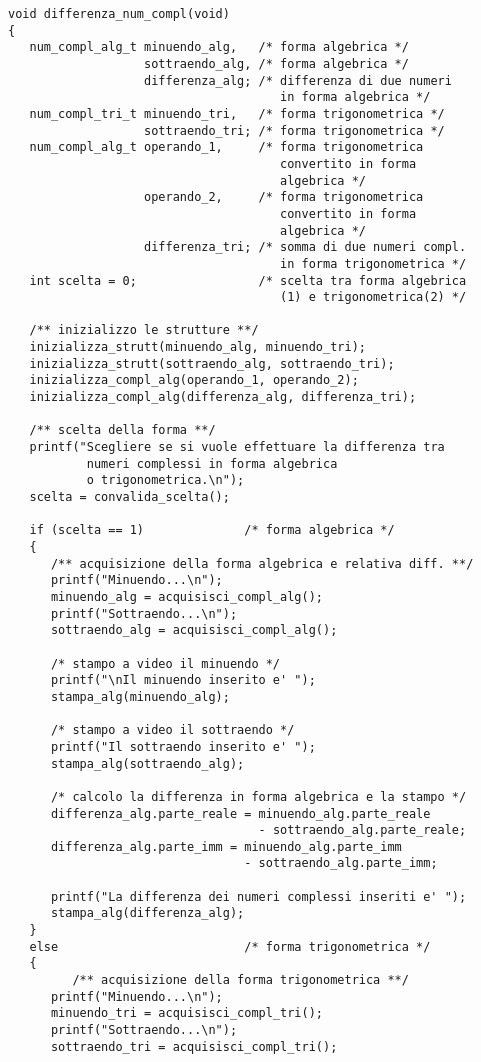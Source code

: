 \documentclass[a4paper,10pt]{article}
\begin{document}
\begin{verbatim}
void differenza_num_compl(void)
{
   num_compl_alg_t minuendo_alg,   /* forma algebrica */
                   sottraendo_alg, /* forma algebrica */
                   differenza_alg; /* differenza di due numeri
                                      in forma algebrica */
   num_compl_tri_t minuendo_tri,   /* forma trigonometrica */
                   sottraendo_tri; /* forma trigonometrica */
   num_compl_alg_t operando_1,     /* forma trigonometrica
                                      convertito in forma
                                      algebrica */
                   operando_2,     /* forma trigonometrica
                                      convertito in forma
                                      algebrica */
                   differenza_tri; /* somma di due numeri compl.
                                      in forma trigonometrica */
   int scelta = 0;                 /* scelta tra forma algebrica
                                      (1) e trigonometrica(2) */

   /** inizializzo le strutture **/
   inizializza_strutt(minuendo_alg, minuendo_tri);
   inizializza_strutt(sottraendo_alg, sottraendo_tri);
   inizializza_compl_alg(operando_1, operando_2);
   inizializza_compl_alg(differenza_alg, differenza_tri);

   /** scelta della forma **/
   printf("Scegliere se si vuole effettuare la differenza tra
           numeri complessi in forma algebrica
           o trigonometrica.\n");
   scelta = convalida_scelta();

   if (scelta == 1)              /* forma algebrica */
   {
      /** acquisizione della forma algebrica e relativa diff. **/
      printf("Minuendo...\n");
      minuendo_alg = acquisisci_compl_alg();
      printf("Sottraendo...\n");
      sottraendo_alg = acquisisci_compl_alg();

      /* stampo a video il minuendo */
      printf("\nIl minuendo inserito e' ");
      stampa_alg(minuendo_alg);

      /* stampo a video il sottraendo */
      printf("Il sottraendo inserito e' ");
      stampa_alg(sottraendo_alg);

      /* calcolo la differenza in forma algebrica e la stampo */
      differenza_alg.parte_reale = minuendo_alg.parte_reale
                                   - sottraendo_alg.parte_reale;
      differenza_alg.parte_imm = minuendo_alg.parte_imm
                                 - sottraendo_alg.parte_imm;

      printf("La differenza dei numeri complessi inseriti e' ");
      stampa_alg(differenza_alg);
   }
   else                          /* forma trigonometrica */
   {
         /** acquisizione della forma trigonometrica **/
      printf("Minuendo...\n");
      minuendo_tri = acquisisci_compl_tri();
      printf("Sottraendo...\n");
      sottraendo_tri = acquisisci_compl_tri();


\end{verbatim}
\end{document}
